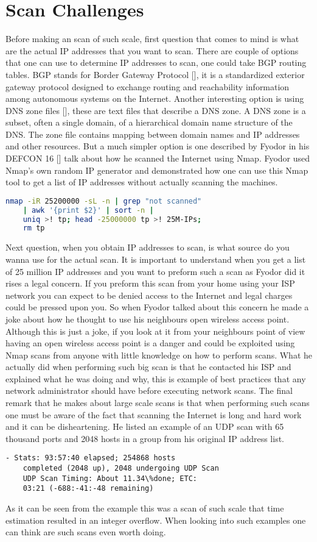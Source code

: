 \documentclass[times, utf8, seminar,english]{fer}
\begin{document}
\section{Scan Challenges}
Before making an scan of such scale, first question that comes to mind is what are the actual IP addresses that you want to scan. There are couple of options that one can use to determine IP addresses to scan, one could take BGP routing tables. BGP stands for Border Gateway Protocol [\cite{wiki:bgp}], it is a standardized exterior gateway protocol designed to exchange routing and reachability information among autonomous systems on the Internet. Another interesting option is using DNS zone files [\cite{wiki:dns}], these are text files that describe a DNS zone. A DNS zone is a subset, often a single domain, of a hierarchical domain name structure of the DNS. The zone file contains mapping between domain names and IP addresses and other resources. But a much simpler option is one described by Fyodor in his DEFCON 16 [\cite{Fyodor}] talk about how he scanned the Internet using Nmap. Fyodor used Nmap's own random IP generator and demonstrated how one can use this Nmap tool to get a list of IP addresses without actually scanning the machines.
\begin{lstlisting}[language=bash, caption= Using Nmap to generate random IP addresses]
	nmap -iR 25200000 -sL -n | grep "not scanned" 
	| awk '{print $2}' | sort -n |
	uniq >! tp; head -25000000 tp >! 25M-IPs;
	rm tp
\end{lstlisting}
Next question, when you obtain IP addresses to scan, is what source do you wanna use for the actual scan. It is important to understand when you get a list of 25 million IP addresses and you want to preform such a scan as Fyodor did it rises a legal concern. If you preform this scan from your home using your ISP network you can expect to be denied access to the Internet and legal charges could be pressed upon you. So when Fyodor talked about this concern he made a joke about how he thought to use his neighbours open wireless access point. Although this is just a joke, if you look at it from your neighbours point of view having an open wireless access point is a danger and could be exploited using Nmap scans from anyone with little knowledge on how to perform scans. What he actually did when performing such big scan is that he contacted his ISP and explained what he was doing and why, this is example of best practices that any network administrator should have before executing network scans. The final remark that he makes about large scale scans is that when performing such scans one must be aware of the fact that scanning the Internet is long and hard work and it can be disheartening. He listed an example of an UDP scan with 65 thousand ports and 2048 hosts in a group from his original IP address list.
\begin{lstlisting}[caption=UDP Scan performance example]
	- Stats: 93:57:40 elapsed; 254868 hosts
	completed (2048 up), 2048 undergoing UDP Scan
	UDP Scan Timing: About 11.34\%done; ETC:
	03:21 (-688:-41:-48 remaining)
\end{lstlisting}
As it can be seen from the example this was a scan of such scale that time estimation resulted in an integer overflow. When looking into such examples one can think are such scans even worth doing.
\end{document}
